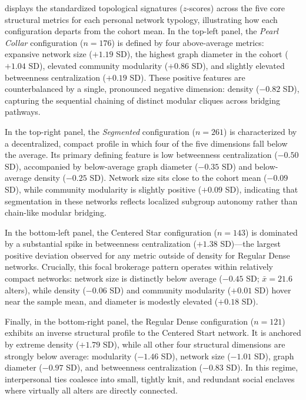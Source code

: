 \documentclass[12pt]{article}
\newcommand{\xbar}{\bar{x}}
\begin{document}
 displays the standardized topological signatures ($z$-scores) across the five core structural metrics for each personal network typology, illustrating how each configuration departs from the cohort mean. In the top-left panel, the \textit{Pearl Collar} configuration ($n = 176$) is defined by four above-average metrics: expansive network size ($+1.19$ SD), the highest graph diameter in the cohort ($+1.04$ SD), elevated community modularity ($+0.86$ SD), and slightly elevated betweenness centralization ($+0.19$ SD). These positive features are counterbalanced by a single, pronounced negative dimension: density ($-0.82$ SD), capturing the sequential chaining of distinct modular cliques across bridging pathways.

In the top-right panel, the \textit{Segmented} configuration ($n = 261$) is characterized by a decentralized, compact profile in which four of the five dimensions fall below the average. Its primary defining feature is low betweenness centralization ($-0.50$ SD), accompanied by below-average graph diameter ($-0.35$ SD) and below-average density ($-0.25$ SD). Network size sits close to the cohort mean ($-0.09$ SD), while community modularity is slightly positive ($+0.09$ SD), indicating that segmentation in these networks reflects localized subgroup autonomy rather than chain-like modular bridging.

In the bottom-left panel, the Centered Star configuration ($n = 143$) is dominated by a substantial spike in betweenness centralization ($+1.38$ SD)---the largest positive deviation observed for any metric outside of density for Regular Dense networks. Crucially, this focal brokerage pattern operates within relatively compact networks: network size is distinctly below average ($-0.45$ SD; $\xbar = 21.6$ alters), while density ($-0.06$ SD) and community modularity ($+0.01$ SD) hover near the sample mean, and diameter is modestly elevated ($+0.18$ SD).

Finally, in the bottom-right panel, the Regular Dense configuration ($n = 121$) exhibits an inverse structural profile to the Centered Start network. It is anchored by extreme density ($+1.79$ SD), while all other four structural dimensions are strongly below average: modularity ($-1.46$ SD), network size ($-1.01$ SD), graph diameter ($-0.97$ SD), and betweenness centralization ($-0.83$ SD). In this regime, interpersonal ties coalesce into small, tightly knit, and redundant social enclaves where virtually all alters are directly connected.
\end{document}
